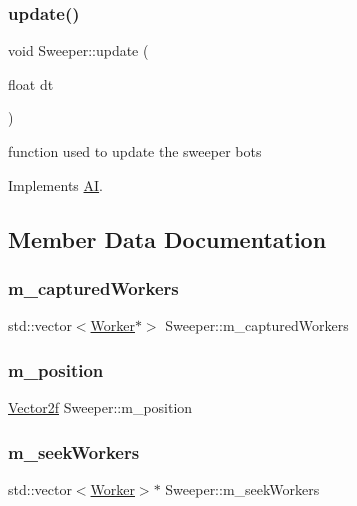 \subsubsection{\texorpdfstring{update()}{update()}}
{\footnotesize\ttfamily void Sweeper\+::update (\begin{DoxyParamCaption}\item[{float}]{dt }\end{DoxyParamCaption})\hspace{0.3cm}{\ttfamily [virtual]}}

function used to update the sweeper bots 

Implements \mbox{\hyperlink{class_a_i_a6a845cbba63ca3eaab42771f10175e7f}{AI}}.



\subsection{Member Data Documentation}
\mbox{\label{class_sweeper_ad78cc8acbe42fb51ac5e9a52a3820c68}} 
\subsubsection{\texorpdfstring{m\_capturedWorkers}{m\_capturedWorkers}}
{\footnotesize\ttfamily std\+::vector$<$\mbox{\hyperlink{class_worker}{Worker}}$\ast$$>$ Sweeper\+::m\+\_\+captured\+Workers}

\mbox{\label{class_sweeper_a2de9bfbe25a8e7a4c0520c74a325e037}} 
\subsubsection{\texorpdfstring{m\_position}{m\_position}}
{\footnotesize\ttfamily \mbox{\hyperlink{class_vector2f}{Vector2f}} Sweeper\+::m\+\_\+position}

\mbox{\label{class_sweeper_a30fbaca5409925343d7e5e1feaf13c68}} 
\subsubsection{\texorpdfstring{m\_seekWorkers}{m\_seekWorkers}}
{\footnotesize\ttfamily std\+::vector$<$\mbox{\hyperlink{class_worker}{Worker}}$>$$\ast$ Sweeper\+::m\+\_\+seek\+Workers}

